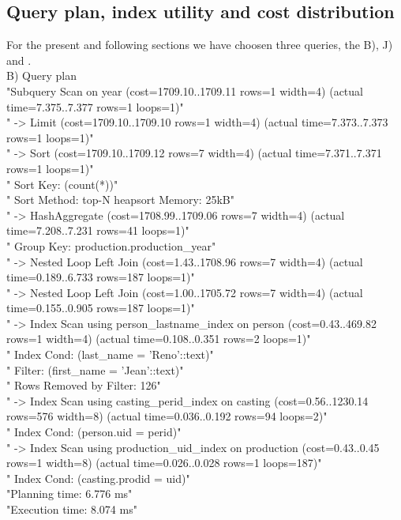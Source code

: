 \documentclass{article}
\begin{document}
\subsection{Query plan, index utility and cost distribution}

For the present and following sections we have choosen three queries, the B), J) and .\\

B) Query plan \\
"Subquery Scan on year  (cost=1709.10..1709.11 rows=1 width=4) (actual time=7.375..7.377 rows=1 loops=1)"\\
"  ->  Limit  (cost=1709.10..1709.10 rows=1 width=4) (actual time=7.373..7.373 rows=1 loops=1)"\\
"        ->  Sort  (cost=1709.10..1709.12 rows=7 width=4) (actual time=7.371..7.371 rows=1 loops=1)"\\
"              Sort Key: (count(*))"\\
"              Sort Method: top-N heapsort  Memory: 25kB"\\
"              ->  HashAggregate  (cost=1708.99..1709.06 rows=7 width=4) (actual time=7.208..7.231 rows=41 loops=1)"\\
"                    Group Key: production.production_year"\\
"                    ->  Nested Loop Left Join  (cost=1.43..1708.96 rows=7 width=4) (actual time=0.189..6.733 rows=187 loops=1)"\\
"                          ->  Nested Loop Left Join  (cost=1.00..1705.72 rows=7 width=4) (actual time=0.155..0.905 rows=187 loops=1)"\\
"                                ->  Index Scan using person_lastname_index on person  (cost=0.43..469.82 rows=1 width=4) (actual time=0.108..0.351 rows=2 loops=1)"\\
"                                      Index Cond: (last_name = 'Reno'::text)"\\
"                                      Filter: (first_name = 'Jean'::text)"\\
"                                      Rows Removed by Filter: 126"\\
"                                ->  Index Scan using casting_perid_index on casting  (cost=0.56..1230.14 rows=576 width=8) (actual time=0.036..0.192 rows=94 loops=2)"\\
"                                      Index Cond: (person.uid = perid)"\\
"                          ->  Index Scan using production_uid_index on production  (cost=0.43..0.45 rows=1 width=8) (actual time=0.026..0.028 rows=1 loops=187)"\\
"                                Index Cond: (casting.prodid = uid)"\\
"Planning time: 6.776 ms"\\
"Execution time: 8.074 ms"\\
\end{document}
